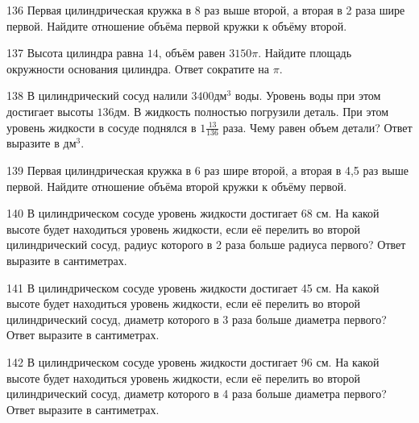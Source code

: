 \documentclass[4apaper]{article}
\begin{document}
\begin{taskBN}{136}
 Первая цилиндрическая кружка в 8 раз выше второй, а вторая в 2 раза шире первой. Найдите отношение объёма первой кружки к объёму второй.
\end{taskBN}

\begin{taskBN}{137}
Высота цилиндра равна $14$, объём равен $3150\pi$. Найдите площадь окружности основания цилиндра. Ответ сократите на $\pi$.
\end{taskBN}

\begin{taskBN}{138}
В цилиндрический сосуд налили $3400\mbox{дм}^3$ воды. Уровень воды при этом достигает высоты $136$дм. В жидкость полностью погрузили деталь. При этом уровень жидкости в сосуде поднялся в ${1}\frac{13}{136}$ раза. Чему равен объем детали? Ответ выразите в $\mbox{дм}^3$.
\end{taskBN}

\begin{taskBN}{139}
 Первая цилиндрическая кружка в 6 раз шире второй, а вторая в 4,5 раз выше первой. Найдите отношение объёма второй кружки к объёму первой.
\end{taskBN}

\begin{taskBN}{140}
В цилиндрическом сосуде уровень жидкости достигает 68 см. На какой высоте будет находиться уровень жидкости, если её перелить во второй цилиндрический сосуд, радиус которого в 2 раза больше радиуса первого? Ответ выразите в сантиметрах.
\end{taskBN}

\begin{taskBN}{141}
В цилиндрическом сосуде уровень жидкости достигает 45 см. На какой высоте будет находиться уровень жидкости, если её перелить во второй цилиндрический сосуд, диаметр которого в 3 раза больше диаметра первого? Ответ выразите в сантиметрах.
\end{taskBN}

\begin{taskBN}{142}
В цилиндрическом сосуде уровень жидкости достигает 96 см. На какой высоте будет находиться уровень жидкости, если её перелить во второй цилиндрический сосуд, диаметр которого в 4 раза больше диаметра первого? Ответ выразите в сантиметрах.
\end{taskBN}
\end{document}
